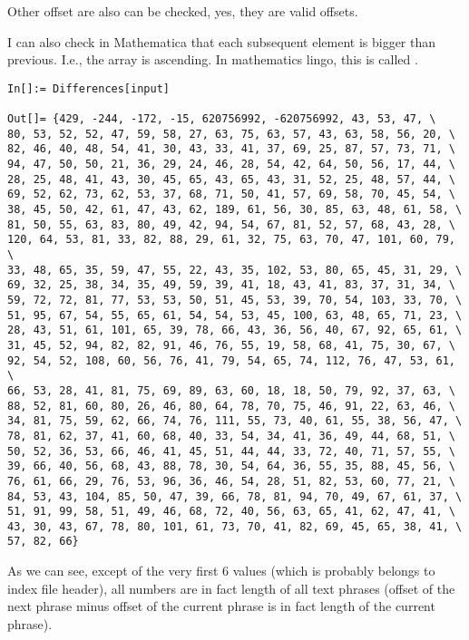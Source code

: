 Other offset are also can be checked, yes, they are valid offsets.

I can also check in Mathematica that each subsequent element is bigger than previous.
I.e., the array is ascending.
In mathematics lingo, this is called .

\begin{lstlisting}[style=custommath]
In[]:= Differences[input]

Out[]= {429, -244, -172, -15, 620756992, -620756992, 43, 53, 47, \
80, 53, 52, 52, 47, 59, 58, 27, 63, 75, 63, 57, 43, 63, 58, 56, 20, \
82, 46, 40, 48, 54, 41, 30, 43, 33, 41, 37, 69, 25, 87, 57, 73, 71, \
94, 47, 50, 50, 21, 36, 29, 24, 46, 28, 54, 42, 64, 50, 56, 17, 44, \
28, 25, 48, 41, 43, 30, 45, 65, 43, 65, 43, 31, 52, 25, 48, 57, 44, \
69, 52, 62, 73, 62, 53, 37, 68, 71, 50, 41, 57, 69, 58, 70, 45, 54, \
38, 45, 50, 42, 61, 47, 43, 62, 189, 61, 56, 30, 85, 63, 48, 61, 58, \
81, 50, 55, 63, 83, 80, 49, 42, 94, 54, 67, 81, 52, 57, 68, 43, 28, \
120, 64, 53, 81, 33, 82, 88, 29, 61, 32, 75, 63, 70, 47, 101, 60, 79, \
33, 48, 65, 35, 59, 47, 55, 22, 43, 35, 102, 53, 80, 65, 45, 31, 29, \
69, 32, 25, 38, 34, 35, 49, 59, 39, 41, 18, 43, 41, 83, 37, 31, 34, \
59, 72, 72, 81, 77, 53, 53, 50, 51, 45, 53, 39, 70, 54, 103, 33, 70, \
51, 95, 67, 54, 55, 65, 61, 54, 54, 53, 45, 100, 63, 48, 65, 71, 23, \
28, 43, 51, 61, 101, 65, 39, 78, 66, 43, 36, 56, 40, 67, 92, 65, 61, \
31, 45, 52, 94, 82, 82, 91, 46, 76, 55, 19, 58, 68, 41, 75, 30, 67, \
92, 54, 52, 108, 60, 56, 76, 41, 79, 54, 65, 74, 112, 76, 47, 53, 61, \
66, 53, 28, 41, 81, 75, 69, 89, 63, 60, 18, 18, 50, 79, 92, 37, 63, \
88, 52, 81, 60, 80, 26, 46, 80, 64, 78, 70, 75, 46, 91, 22, 63, 46, \
34, 81, 75, 59, 62, 66, 74, 76, 111, 55, 73, 40, 61, 55, 38, 56, 47, \
78, 81, 62, 37, 41, 60, 68, 40, 33, 54, 34, 41, 36, 49, 44, 68, 51, \
50, 52, 36, 53, 66, 46, 41, 45, 51, 44, 44, 33, 72, 40, 71, 57, 55, \
39, 66, 40, 56, 68, 43, 88, 78, 30, 54, 64, 36, 55, 35, 88, 45, 56, \
76, 61, 66, 29, 76, 53, 96, 36, 46, 54, 28, 51, 82, 53, 60, 77, 21, \
84, 53, 43, 104, 85, 50, 47, 39, 66, 78, 81, 94, 70, 49, 67, 61, 37, \
51, 91, 99, 58, 51, 49, 46, 68, 72, 40, 56, 63, 65, 41, 62, 47, 41, \
43, 30, 43, 67, 78, 80, 101, 61, 73, 70, 41, 82, 69, 45, 65, 38, 41, \
57, 82, 66}
\end{lstlisting}

As we can see, except of the very first 6 values (which is probably belongs to index file header), all numbers are in fact length of all text phrases (offset of the next phrase minus offset of the current phrase is in fact length of the current phrase).

